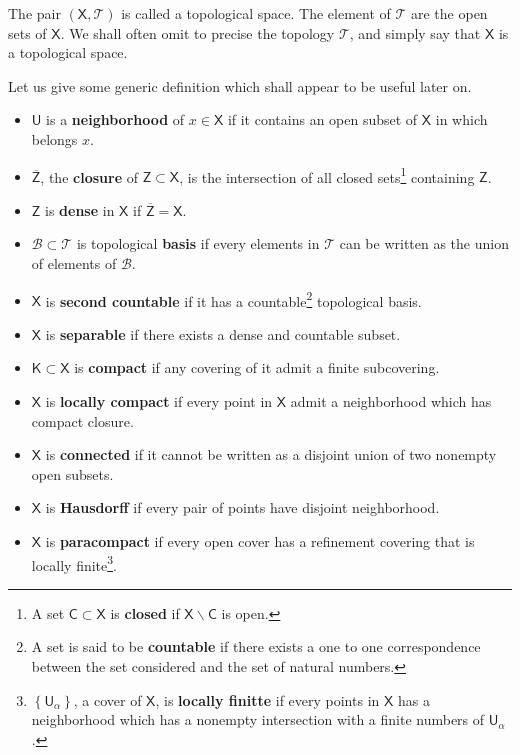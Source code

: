 \documentclass[11pt]{book}
\newcommand{\Bcal}{\mathcal{B}}
\newcommand{\Tcal}{\mathcal{T}}
\newcommand{\Csf}{\mathsf{C}}
\newcommand{\Ksf}{\mathsf{K}}
\newcommand{\Usf}{\mathsf{U}}
\newcommand{\Xsf}{\mathsf{X}}
\newcommand{\Zsf}{\mathsf{Z}}
\theoremstyle{break}
\begin{document}
The pair $(\Xsf,\Tcal)$ is called a topological space. The element of $\Tcal$ are the open sets of $\Xsf$. We shall often omit to precise the topology $\Tcal$, and simply say that $\Xsf$ is a topological space.\par%


\bigskip


Let us give some generic definition which shall appear to be useful later on.%


\begin{itemize}
\vspace*{-4pt}
\setlength{\itemsep}{-1pt}%
%
\item $\Usf$ is a \textbf{neighborhood} of $x \in \Xsf$ if it contains an open subset of $\Xsf$ in which belongs $x$.%
%
\item $\overline{\Zsf}$, the \textbf{closure} of $\Zsf \subset \Xsf$, is the intersection of all closed sets\footnote{A set $\Csf \subset \Xsf$ is \textbf{closed} if $\Xsf \backslash \Csf$ is open.} containing $\Zsf$.%
%
\item $\Zsf$ is \textbf{dense} in $\Xsf$ if $\overline{\Zsf} = \Xsf$.%
%
\item $\Bcal \subset \Tcal$ is topological \textbf{basis} if every elements in $\Tcal$ can be written as the union of elements of $\Bcal$.%
%
\item $\Xsf$ is \textbf{second countable} if it has a countable\footnote{A set is said to be \textbf{countable} if there exists a one to one correspondence between the set considered and the set of natural numbers.} topological basis.%
%
\item $\Xsf$ is \textbf{separable} if there exists a dense and countable subset.%
%
\item $\Ksf \subset \Xsf$ is \textbf{compact} if any covering of it admit a finite subcovering.%
%
\item $\Xsf$ is \textbf{locally compact} if every point in $\Xsf$ admit a neighborhood which has compact closure.%
%
\item $\Xsf$ is \textbf{connected} if it cannot be written as a disjoint union of two nonempty open subsets.%
%
\item $\Xsf$ is \textbf{Hausdorff} if every pair of points have disjoint neighborhood.%
%
\item $\Xsf$ is \textbf{paracompact} if every open cover has a refinement covering that is locally finite\footnote{$\left\{\Usf_\alpha\right\}$, a cover of $\Xsf$, is \textbf{locally finitte} if every points in $\Xsf$ has a neighborhood which has a nonempty intersection with a finite numbers of $\Usf_\alpha$.}.%
%
\end{itemize}
\end{document}

